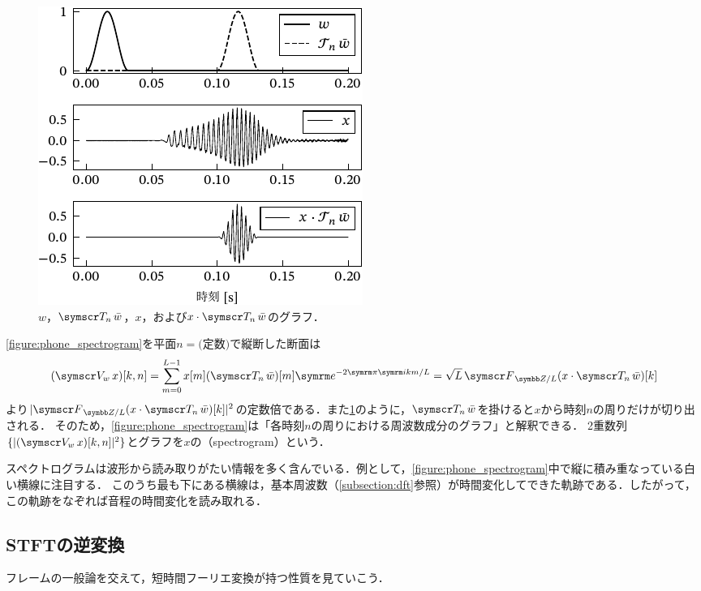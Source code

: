 \documentclass[../../main]{subfiles}
\begin{document}
\begin{figure}[htbp]
  \centering
  \includegraphics{figures/windowing.pdf}
  \caption{\(w\)，\(\translate{n}\conj{w}\)，\(x\)，および\(x\cdot\translate{n}\conj{w}\)のグラフ．}
  \label{figure:windowing}
\end{figure}

\cref{figure:phone_spectrogram}を平面\(n=\text{(定数)}\)で縦断した断面は
\[
  (\stft{w}x)[k,n] = \sum_{m=0}^{L-1}x[m](\translate{n}\conj{w})[m]\napr^{-2\krez\iuni km/L}
  = \sqrt{L}\dft{L}(x\cdot\translate{n}\conj{w})[k]
\]
より\(\abs{\dft{L}(x\cdot\translate{n}\conj{w})[k]}^2\)の定数倍である．また\cref{figure:windowing}のように，\(\translate{n}\conj{w}\)を掛けると\(x\)から時刻\(n\)の周りだけが切り出される．
そのため，\cref{figure:phone_spectrogram}は「各時刻\(n\)の周りにおける周波数成分のグラフ」と解釈できる．
2重数列\(\seq{\abs{(\stft{w}x)[k,n]}^2}\)とグラフを\(x\)の（spectrogram）という．

スペクトログラムは波形から読み取りがたい情報を多く含んでいる．例として，\cref{figure:phone_spectrogram}中で縦に積み重なっている白い横線に注目する．
このうち最も下にある横線は，基本周波数（\cref{subsection:dft}参照）が時間変化してできた軌跡である．したがって，この軌跡をなぞれば音程の時間変化を読み取れる．

\subsection{STFTの逆変換}

フレームの一般論を交えて，短時間フーリエ変換が持つ性質を見ていこう．
\end{document}
